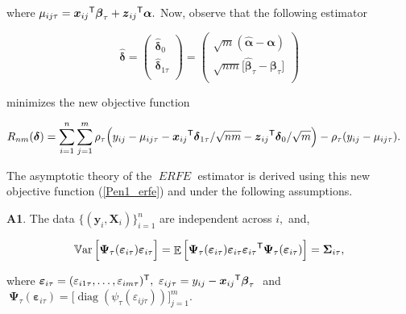 \documentclass[15pt,a4paper]{article}
\DeclareMathOperator{\Var}{\mathbb{V}\text{ar}}
\DeclareMathOperator{\E}{\mathbb{E}}
\DeclareMathOperator{\diag}{diag}
\newcommand{\transpose}{{}^{\text{\sffamily T}}}
\DeclareMathOperator{\ERFE}{\textit{ERFE}}
\begin{document}
where \(\mu_{ij\tau}=\boldsymbol{x}_{ij}\transpose \boldsymbol{\beta}_{\tau} + \boldsymbol{z}_{ij}\transpose\boldsymbol{\alpha}.\) Now, observe that the following estimator

\begin{equation*}
\widehat{\boldsymbol{\delta}}=
\begin{pmatrix}
\widehat{\boldsymbol{\delta}}_0\\
\widehat{\boldsymbol{\delta}}_{1\tau}\\
\end{pmatrix}
=
\begin{pmatrix}
\sqrt{m} ( \widehat{\boldsymbol{\alpha}} - \boldsymbol{\alpha})\\
\sqrt{nm}\Big[\widehat{\boldsymbol{\beta}}_{\tau}-\boldsymbol{\beta}_{\tau}\Big]\\
\end{pmatrix}
\end{equation*}

minimizes the new objective function

\begin{equation}\label{Pen1_erfe}
\begin{split}
  {}& R_{nm}(\boldsymbol{\delta})= \sum_{i=1}^{n}\sum_{j=1}^{m} \rho_{\tau} 
  \Big( y_{ij}-\mu_{ij\tau}-\boldsymbol{x}_{ij}\transpose\boldsymbol{\delta}_{1\tau}/\sqrt{nm}-\boldsymbol{z}_{ij}\transpose\boldsymbol{\delta}_0/\sqrt{m}\Big)-\rho_{\tau}(y_{ij}-\mu_{ij\tau}).
\end{split}
\end{equation}

The asymptotic theory of the $\ERFE$ estimator is derived using this new objective function (\ref{Pen1_erfe}) and under the following assumptions.

\textbf{A1}. The data \(\lbrace (\boldsymbol{y}_i,\boldsymbol{X}_i)\rbrace_{i=1}^{n}\) are independent across \(i,\) and,

\begin{equation*}
\Var\Big[\boldsymbol{\Psi}_{\tau}(\boldsymbol{\varepsilon}_{i\tau})\boldsymbol{\varepsilon}_{i\tau}\Big]= \E\Big[\boldsymbol{\Psi}_{\tau}(\boldsymbol{\varepsilon}_{i\tau})\boldsymbol{\varepsilon}_{i\tau}\boldsymbol{\varepsilon}_{i\tau}\transpose
\boldsymbol{\Psi}_{\tau}(\boldsymbol{\varepsilon}_{i\tau})\Big]=\boldsymbol{\Sigma}_{i\tau }, 
\end{equation*}

where $\boldsymbol{\varepsilon}_{i\tau}=(\varepsilon_{i1\tau},\ldots,\varepsilon_{im\tau})\transpose, \ \varepsilon_{ij\tau}=y_{ij}-\boldsymbol{x}_{ij}\transpose\boldsymbol{\beta}_{\tau}\ $ and $ \ \boldsymbol{\Psi}_{\tau }(\boldsymbol{\varepsilon}_{i\tau})=\Big[\diag(\psi_{\tau}(\varepsilon_{ij\tau}))\Big]_{j=1}^{m}.$
\end{document}
